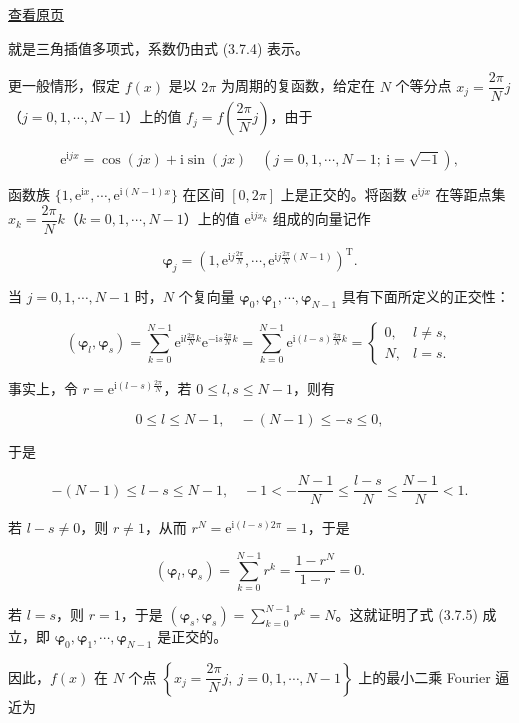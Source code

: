 \documentclass[
  10pt,
  fontset=fandol]{ctexart}
\begin{document}
\href{../../source-images/pdf-086.jpeg}{查看原页}

就是三角插值多项式，系数仍由式 (3.7.4) 表示。

更一般情形，假定 \(f(x)\) 是以 \(2\pi\) 为周期的复函数，给定在 \(N\) 个等分点 \(x_j=\dfrac{2\pi}{N}j\)（\(j=0,1,\cdots,N-1\)）上的值 \(f_j=f\left(\dfrac{2\pi}{N}j\right)\)，由于

\[
\mathrm e^{\mathrm ijx}=\cos(jx)+\mathrm i\sin(jx)\quad(j=0,1,\cdots,N-1;\ \mathrm i=\sqrt{-1}),
\]

函数族 \(\{1,\mathrm e^{\mathrm ix},\cdots,\mathrm e^{\mathrm i(N-1)x}\}\) 在区间 \([0,2\pi]\) 上是正交的。将函数 \(\mathrm e^{\mathrm ijx}\) 在等距点集 \(x_k=\dfrac{2\pi}{N}k\)（\(k=0,1,\cdots,N-1\)）上的值 \(\mathrm e^{\mathrm ijx_k}\) 组成的向量记作

\[
\boldsymbol\varphi_j=\left(1,\mathrm e^{\mathrm ij\frac{2\pi}{N}},\cdots,\mathrm e^{\mathrm ij\frac{2\pi}{N}(N-1)}\right)^{\mathrm T}.
\]

当 \(j=0,1,\cdots,N-1\) 时，\(N\) 个复向量 \(\boldsymbol\varphi_0,\boldsymbol\varphi_1,\cdots,\boldsymbol\varphi_{N-1}\) 具有下面所定义的正交性：

\[
(\boldsymbol\varphi_l,\boldsymbol\varphi_s)=\sum_{k=0}^{N-1}\mathrm e^{\mathrm il\frac{2\pi}{N}k}\mathrm e^{-\mathrm is\frac{2\pi}{N}k}=\sum_{k=0}^{N-1}\mathrm e^{\mathrm i(l-s)\frac{2\pi}{N}k}=\begin{cases}0,&l\ne s,\\N,&l=s.\end{cases}\tag{3.7.5}
\]

事实上，令 \(r=\mathrm e^{\mathrm i(l-s)\frac{2\pi}{N}}\)，若 \(0\leqslant l,s\leqslant N-1\)，则有

\[
0\leqslant l\leqslant N-1,\quad-(N-1)\leqslant-s\leqslant0,
\]

于是

\[
-(N-1)\leqslant l-s\leqslant N-1,\quad-1<-\frac{N-1}{N}\leqslant\frac{l-s}{N}\leqslant\frac{N-1}{N}<1.
\]

若 \(l-s\ne0\)，则 \(r\ne1\)，从而 \(r^N=\mathrm e^{\mathrm i(l-s)2\pi}=1\)，于是

\[
(\boldsymbol\varphi_l,\boldsymbol\varphi_s)=\sum_{k=0}^{N-1}r^k=\frac{1-r^N}{1-r}=0.
\]

若 \(l=s\)，则 \(r=1\)，于是 \((\boldsymbol\varphi_s,\boldsymbol\varphi_s)=\sum_{k=0}^{N-1}r^k=N\)。这就证明了式 (3.7.5) 成立，即 \(\boldsymbol\varphi_0,\boldsymbol\varphi_1,\cdots,\boldsymbol\varphi_{N-1}\) 是正交的。

因此，\(f(x)\) 在 \(N\) 个点 \(\left\{x_j=\dfrac{2\pi}{N}j,\ j=0,1,\cdots,N-1\right\}\) 上的最小二乘 Fourier 逼近为
\end{document}
